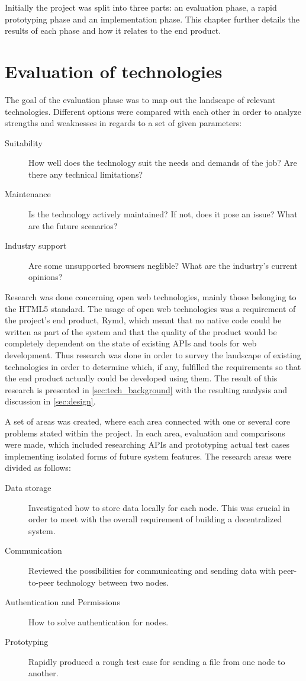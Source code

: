 Initially the project was split into three parts: an evaluation phase, a rapid prototyping phase and an implementation phase. This chapter further details the results of each phase and how it relates to the end product.

\section{Evaluation of technologies}

The goal of the evaluation phase was to map out the landscape of relevant technologies. Different options were compared  with each other in order to analyze strengths and weaknesses in regards to a set of given parameters:

\begin{description}
  \item[Suitability] How well does the technology suit the needs and demands of the job? Are there any technical limitations?
  \item[Maintenance] Is the technology actively maintained? If not, does it pose an issue? What are the future scenarios?
  \item[Industry support] Are some unsupported browsers neglible? What are the industry's current opinions?
\end{description}

Research was done concerning open web technologies, mainly those belonging to the HTML5 standard. The usage of open web technologies was a requirement of the project's end product, Rymd, which meant that no native code could be written as part of the system and that the quality of the product would be completely dependent on the state of existing APIs and tools for web development. Thus research was done in order to survey the landscape of existing technologies in order to determine which, if any, fulfilled the requirements so that the end product actually could be developed using them. The result of this research is presented in \ref{sec:tech_background} with the resulting analysis and discussion in \ref{sec:design}.

A set of areas was created, where each area connected with one or several core problems stated within the project. In each area, evaluation and comparisons were made, which included researching APIs and prototyping actual test cases implementing isolated forms of future system features. The research areas were divided as follows:

\begin{description}
\item[Data storage] Investigated how to store data locally for each node. This was crucial in order to meet with the overall requirement of building a decentralized system.
\item[Communication] Reviewed the possibilities for communicating and sending data with peer-to-peer technology between two nodes.
\item[Authentication and Permissions] How to solve authentication for nodes.
\item[Prototyping] Rapidly produced a rough test case for sending a file from one node to another.
\end{description}



